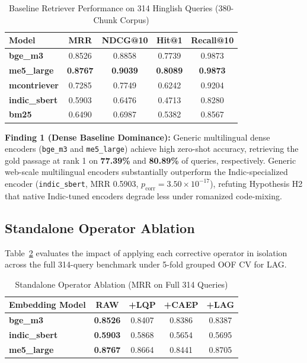 \documentclass[conference]{IEEEtran}
\begin{document}
\begin{table}[t]
\caption{Baseline Retriever Performance on 314 Hinglish Queries (380-Chunk Corpus)}
\label{tab:baselines}
\centering
\begin{tabular}{lcccc}
\toprule
Model & MRR & NDCG@10 & Hit@1 & Recall@10 \\
\midrule
\textbf{bge\_m3} & 0.8526 & 0.8858 & 0.7739 & 0.9873 \\
\textbf{me5\_large} & \textbf{0.8767} & \textbf{0.9039} & \textbf{0.8089} & \textbf{0.9873} \\
\textbf{mcontriever} & 0.7285 & 0.7749 & 0.6242 & 0.9204 \\
\textbf{indic\_sbert} & 0.5903 & 0.6476 & 0.4713 & 0.8280 \\
\textbf{bm25} & 0.6490 & 0.6987 & 0.5382 & 0.8567 \\
\bottomrule
\end{tabular}
\end{table}

\textbf{Finding 1 (Dense Baseline Dominance):} Generic multilingual dense encoders (\texttt{bge\_m3} and \texttt{me5\_large}) achieve high zero-shot accuracy, retrieving the gold passage at rank 1 on \textbf{77.39\%} and \textbf{80.89\%} of queries, respectively. Generic web-scale multilingual encoders substantially outperform the Indic-specialized encoder (\texttt{indic\_sbert}, MRR 0.5903, $p_{\text{corr}} = 3.50 \times 10^{-17}$), refuting Hypothesis H2 that native Indic-tuned encoders degrade less under romanized code-mixing.

\subsection{Standalone Operator Ablation}
Table~\ref{tab:ablation} evaluates the impact of applying each corrective operator in isolation across the full 314-query benchmark under 5-fold grouped OOF CV for LAG.

\begin{table}[t]
\caption{Standalone Operator Ablation (MRR on Full 314 Queries)}
\label{tab:ablation}
\centering
\begin{tabular}{lcccc}
\toprule
Embedding Model & RAW & +LQP & +CAEP & +LAG \\
\midrule
\textbf{bge\_m3} & \textbf{0.8526} & 0.8407 & 0.8386 & 0.8387 \\
\textbf{indic\_sbert} & \textbf{0.5903} & 0.5868 & 0.5654 & 0.5695 \\
\textbf{me5\_large} & \textbf{0.8767} & 0.8664 & 0.8441 & 0.8705 \\
\bottomrule
\end{tabular}
\end{table}
\end{document}
